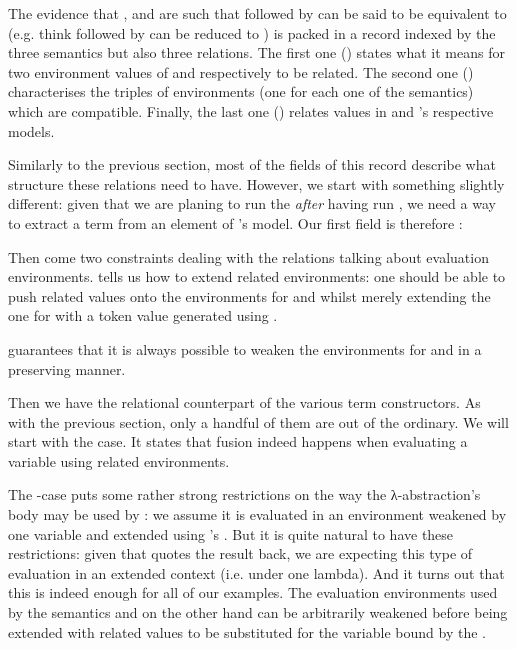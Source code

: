 The evidence that ,  and  are such
that  followed by  can be said to be equivalent
to  (e.g. think  followed by 
can be reduced to ) is packed in a record
 indexed by the three semantics but also three
relations. The first one () states what it means
for two environment values of  and  respectively
to be related. The second one () characterises the triples
of environments (one for each one of the semantics) which are
compatible. Finally, the last one () relates values
in  and 's respective models.


Similarly to the previous section, most of the fields of this
record describe what structure these relations need to have.
However, we start with something slightly different: given that
we are planing to run the   \emph{after}
having run , we need a way to extract a term from an
element of 's model. Our first field is therefore
:


Then come two constraints dealing with the relations talking
about evaluation environments.  tells us how to
extend related environments: one should be able to push related
values onto the environments for  and  whilst
merely extending the one for  with a token value generated
using .

 guarantees that it is always possible to weaken
the environments for  and  in a 
preserving manner.


Then we have the relational counterpart of the various term
constructors. As with the previous section, only a handful of
them are out of the ordinary. We will start with the 
case. It states that fusion indeed happens when evaluating a
variable using related environments.


The -case puts some rather strong restrictions on the way
the λ-abstraction's body may be used by : we assume it
is evaluated in an environment weakened by one variable and extended
using 's . But it is quite natural to have these
restrictions: given that  quotes the result back, we are
expecting this type of evaluation in an extended context (i.e. under
one lambda). And it turns out that this is indeed enough for all of
our examples.
The evaluation environments used by the semantics  and 
on the other hand can be arbitrarily weakened before being extended with
related values to be substituted for the variable bound by the .

